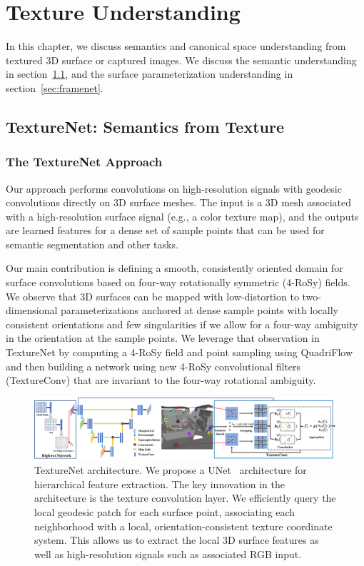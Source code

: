\chapter{Texture Understanding}
\label{chapter:texturenet}
In this chapter, we discuss semantics and canonical space understanding from textured 3D surface or captured images. We discuss the semantic understanding in section~\ref{sec:texturenet}, and the surface parameterization understanding in section~\ref{sec:framenet}.

\section{TextureNet: Semantics from Texture}
\label{sec:texturenet}
\subsection{The TextureNet Approach}
Our approach performs convolutions on high-resolution signals with geodesic convolutions directly on 3D surface meshes.
The input is a 3D mesh associated with a high-resolution surface signal (e.g., a color texture map), and the outputs are learned features for a dense set of sample points that can be used for semantic segmentation and other tasks.   

Our main contribution is defining a smooth, consistently oriented domain for surface convolutions based on four-way rotationally symmetric (4-RoSy) fields.   We observe that 3D surfaces can be mapped with low-distortion to two-dimensional parameterizations anchored at dense sample points with locally consistent orientations and few singularities if we allow for a four-way ambiguity in the orientation at the sample points.   We leverage that observation in TextureNet by computing a 4-RoSy field and point sampling using QuadriFlow~\cite{huang2018quadriflow} and then building a network using new 4-RoSy convolutional filters (TextureConv) that are invariant to the four-way rotational ambiguity.   

\begin{figure}
\includegraphics[width=\linewidth]{texturenet/diagram/network.pdf}
\caption{TextureNet architecture. We propose a UNet~\cite{ronneberger2015u} architecture for hierarchical feature extraction. The key innovation in the architecture is the texture convolution layer. We efficiently query the local geodesic patch for each surface point, associating each neighborhood with a local, orientation-consistent texture coordinate system. This allows us to extract the local 3D surface features as well as high-resolution signals such as associated RGB input.}
\label{fig:texturenet-approach-network}
\end{figure}

